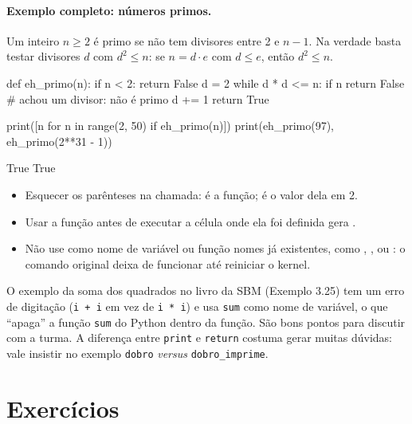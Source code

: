 \paragraph{Exemplo completo: números primos.} Um inteiro $n\ge 2$ é primo se não tem divisores entre 2 e $n-1$.
Na verdade basta testar divisores $d$ com $d^2\le n$: se $n=d\cdot e$ com $d\le e$, então $d^2\le n$.

\begin{entrada}
def eh_primo(n):
    if n < 2:
        return False
    d = 2
    while d * d <= n:
        if n %
            return False      # achou um divisor: não é primo
        d += 1
    return True

print([n for n in range(2, 50) if eh_primo(n)])
print(eh_primo(97), eh_primo(2**31 - 1))
\end{entrada}
\begin{saida}
[2, 3, 5, 7, 11, 13, 17, 19, 23, 29, 31, 37, 41, 43, 47]
True True
\end{saida}

\begin{atencao}
\begin{itemize}
  \item Esquecer os parênteses na chamada:  é a função;  é o valor dela em 2.
  \item Usar a função antes de executar a célula onde ela foi definida gera .
  \item Não use como nome de variável ou função nomes já existentes, como , ,  ou
  : o comando original deixa de funcionar até reiniciar o kernel.
\end{itemize}
\end{atencao}

\begin{professor}
O exemplo da soma dos quadrados no livro da SBM (Exemplo 3.25) tem um erro de digitação (\texttt{i + i} em vez de
\texttt{i * i}) e usa \texttt{sum} como nome de variável, o que ``apaga'' a função \texttt{sum} do Python dentro
da função. São bons pontos para discutir com a turma. A diferença entre \texttt{print} e \texttt{return} costuma
gerar muitas dúvidas: vale insistir no exemplo \texttt{dobro} \emph{versus} \texttt{dobro\_imprime}.
\end{professor}

\section{Exercícios}

